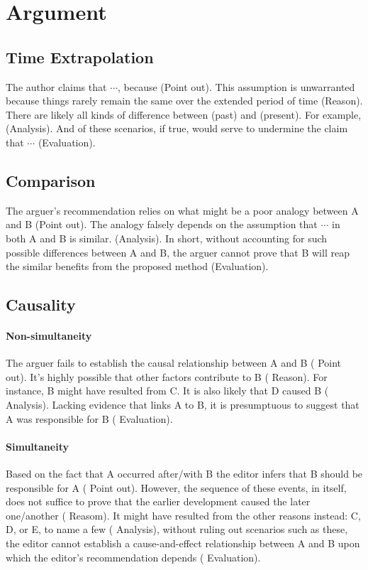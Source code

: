 \section{Argument}
\subsection{Time Extrapolation}
The author claims that \(\cdots\), because ({\color{red}Point out}).
This assumption is unwarranted because things rarely remain the same over the extended period of time ({\color{red}Reason}).
There are likely all kinds of difference between (past) and (present).
For example, ({\color{red}Analysis}).
And of these scenarios, if true, would serve to undermine the claim that \(\cdots\) ({\color{red}Evaluation}).

\subsection{Comparison}
The arguer's recommendation relies on what might be a poor analogy between A and B ({\color{red}Point out}).
The analogy falsely depends on the assumption that \(\cdots\) in both A and B is similar.
({\color{red}Analysis}).
In short, without accounting for such possible differences between A and B, the arguer cannot prove that B will reap the similar benefits from the proposed method ({\color{red}Evaluation}).

\subsection{Causality}
\paragraph{Non-simultaneity}
The arguer fails to establish the causal relationship between A and B ({\color{red} Point out}).
It's highly possible that other factors contribute to B ({\color{red} Reason}).
For instance, B might have resulted from C.
It is also likely that D caused B ({\color{red} Analysis}).
Lacking evidence that links A to B, it is presumptuous to suggest that A was responsible for B ({\color{red} Evaluation}).

\paragraph{Simultaneity}
Based on the fact that A occurred after/with B the editor infers that B should be responsible for A ({\color{red} Point out}).
However, the sequence of these events, in itself, does not suffice to prove that the earlier development caused the later one/another ({\color{red} Reasom}).
It might have resulted from the other reasons instead: C, D, or E, to name a few ({\color{red} Analysis}), without ruling out scenarios such as these, the editor cannot establish a cause-and-effect relationship between A and B upon which the editor's recommendation depends ({\color{red} Evaluation}).